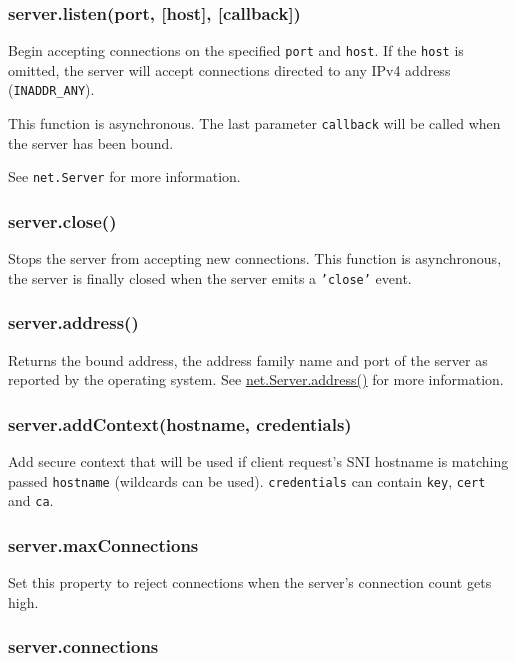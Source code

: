 \subsubsection{server.listen(port, {[}host{]}, {[}callback{]})}

Begin accepting connections on the specified \texttt{port} and
\texttt{host}. If the \texttt{host} is omitted, the server will accept
connections directed to any IPv4 address (\texttt{INADDR\_ANY}).

This function is asynchronous. The last parameter \texttt{callback} will
be called when the server has been bound.

See \texttt{net.Server} for more information.

\subsubsection{server.close()}

Stops the server from accepting new connections. This function is
asynchronous, the server is finally closed when the server emits a
\texttt{'close'} event.

\subsubsection{server.address()}

Returns the bound address, the address family name and port of the
server as reported by the operating system. See
\href{net.html\#net\_server\_address}{net.Server.address()} for more
information.

\subsubsection{server.addContext(hostname, credentials)}

Add secure context that will be used if client request's SNI hostname is
matching passed \texttt{hostname} (wildcards can be used).
\texttt{credentials} can contain \texttt{key}, \texttt{cert} and
\texttt{ca}.

\subsubsection{server.maxConnections}

Set this property to reject connections when the server's connection
count gets high.

\subsubsection{server.connections}

